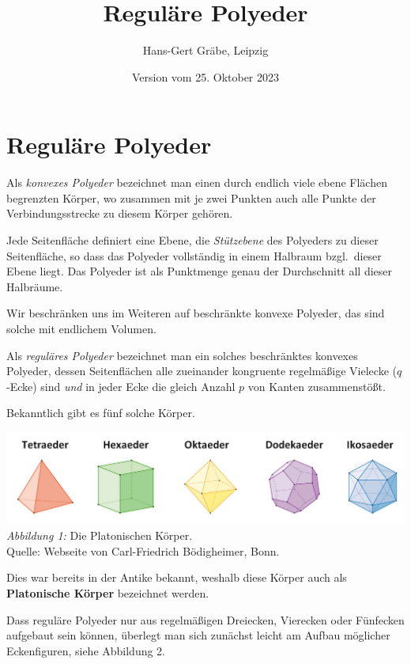 \documentclass[11pt]{article}
\author{Hans-Gert Gräbe, Leipzig}
\title{Reguläre Polyeder\kosemnetlicensemark}
\date{Version vom 25. Oktober 2023}
\begin{document}
\maketitle

\section*{Reguläre Polyeder}

Als \emph{konvexes Polyeder} bezeichnet man einen durch endlich viele ebene
Flä\-chen begrenzten Körper, wo zusammen mit je zwei Punkten auch alle Punkte
der Verbindungsstrecke zu diesem Körper gehören.

Jede Seitenfläche definiert eine Ebene, die \emph{Stützebene} des Polyeders zu
dieser Seitenfläche, so dass das Polyeder vollständig in einem Halbraum
bzgl.\ dieser Ebene liegt. Das Polyeder ist als Punktmenge genau der
Durchschnitt all dieser Halbräume. 

Wir beschränken uns im Weiteren auf beschränkte konvexe Polyeder, das sind
solche mit endlichem Volumen. 

Als \emph{reguläres Polyeder} bezeichnet man ein solches beschränktes konvexes
Polyeder, dessen Seitenflächen alle zueinander kongruente regelmäßige Vielecke
($q$-Ecke) sind \emph{und} in jeder Ecke die gleich Anzahl $p$ von Kanten
zusammenstößt.

Bekanntlich gibt es fünf solche Körper.
\begin{center}
  \includegraphics[width=.8\textwidth]{graebe-05-1/PlatonischeKoerper.jpg}\\
  \emph{Abbildung 1:} Die Platonischen Körper.\\ Quelle: Webseite von
  Carl-Friedrich Bödigheimer, Bonn. 
\end{center}
Dies war bereits in der Antike bekannt, weshalb diese Körper auch als
\textbf{Platonische Körper} bezeichnet werden.  

Dass reguläre Polyeder nur aus regelmäßigen Dreiecken, Vierecken oder
Fünfecken aufgebaut sein können, überlegt man sich zunächst leicht am Aufbau
möglicher Eckenfiguren, siehe Abbildung 2.
\end{document}
